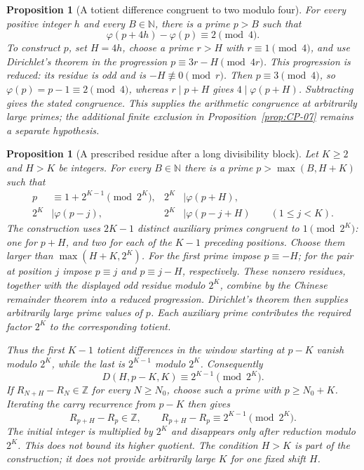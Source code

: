 \documentclass[11pt]{article}
\theoremstyle{plain}
\newtheorem{prop}[thm]{Proposition}
\theoremstyle{definition}
\theoremstyle{remark}
\begin{document}
\begin{prop}[A totient difference congruent to two modulo four]\label{prop:CP-05-inv}
For every positive integer $h$ and every $B\in\mathbb N$, there is
 a prime $p>B$ such that
\[
 \varphi(p+4h)-\varphi(p)\equiv2\pmod4.
\]
To construct $p$, set $H=4h$, choose a prime $r>H$ with
$r\equiv1\pmod4$, and use Dirichlet's theorem in the progression
$p\equiv3r-H\pmod{4r}$. This progression is reduced: its residue is
odd and is $-H\not\equiv0\pmod r$. Then $p\equiv3\pmod4$, so
$\varphi(p)=p-1\equiv2\pmod4$, whereas $r\mid p+H$ gives
$4\mid\varphi(p+H)$. Subtracting gives the stated congruence.
This supplies the arithmetic congruence at arbitrarily large primes;
the additional finite exclusion in Proposition~\ref{prop:CP-07}
remains a separate hypothesis.

\end{prop}

\begin{prop}[A prescribed residue after a long divisibility block]\label{prop:TA-inv}
Let $K\ge2$ and $H>K$ be integers. For every $B\in\mathbb N$ there
is a prime $p>\max(B,H+K)$ such that
\[
\begin{aligned}
 p&\equiv1+2^{K-1}\pmod{2^K},&
 2^K&\mid\varphi(p+H),\\
 2^K&\mid\varphi(p-j),&
 2^K&\mid\varphi(p-j+H)\qquad(1\le j<K).
\end{aligned}
\]
The construction uses $2K-1$ distinct auxiliary primes congruent to
$1\pmod{2^K}$: one for $p+H$, and two for each of the $K-1$
preceding positions. Choose them larger than $\max(H+K,2^K)$.
For the first prime impose $p\equiv-H$; for the pair at position $j$
impose $p\equiv j$ and $p\equiv j-H$, respectively. These nonzero
residues, together with the displayed odd residue modulo $2^K$,
combine by the Chinese remainder theorem into a reduced progression.
Dirichlet's theorem then supplies arbitrarily large prime values of $p$.
Each auxiliary prime contributes the required factor $2^K$ to the
corresponding totient.

Thus the first $K-1$ totient differences in the window starting at
$p-K$ vanish modulo $2^K$, while the last is $2^{K-1}$ modulo $2^K$.
Consequently
\[
 D(H,p-K,K)\equiv2^{K-1}\pmod{2^K}.
\]
If $R_{N+H}-R_N\in\mathbb Z$ for every $N\ge N_0$, choose such a
prime with $p\ge N_0+K$. Iterating the carry recurrence from $p-K$
then gives
\[
 R_{p+H}-R_p\in\mathbb Z,\qquad
 R_{p+H}-R_p\equiv2^{K-1}\pmod{2^K}.
\]
The initial integer is multiplied by $2^K$ and disappears only after
reduction modulo $2^K$. This does not bound its higher quotient.
The condition $H>K$ is part of the construction; it does not provide
arbitrarily large $K$ for one fixed shift $H$.

\end{prop}
\end{document}
